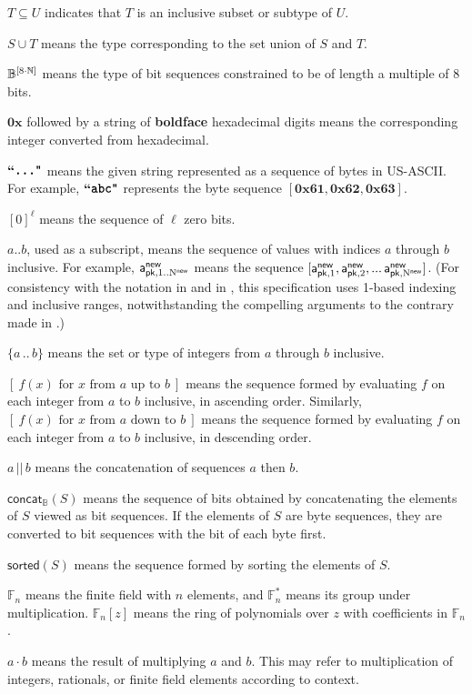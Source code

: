 \documentclass{article}
\renewcommand{\emph}[1]{\hspace{0.15em}{\fontfamily{pnc}\selectfont\scalebox{1.02}[0.999]{\textit{#1}}}\hspace{0.02em}}
\let\oldtexttt\texttt
\renewcommand{\texttt}[1]{\scalebox{1.02}[1.07]{\oldtexttt{#1}}}
\numberwithin{theorem}{subsection}
\newcommand{\zeros}[1]{[0]^{#1}}
\newcommand{\bit}{\mathbb{B}}
\newcommand{\Nat}{\mathbb{N}}
\newcommand{\typeexp}[2]{{#1}\vphantom{)}^{[{#2}]}}
\newcommand{\byteseqs}{\typeexp{\bit}{8 \mult \Nat}}
\newcommand{\concatbits}{\mathsf{concat}_\bit}
\newcommand{\listcomp}[1]{[~{#1}~]}
\newcommand{\for}{\text{ for }}
\newcommand{\from}{\text{ from }}
\newcommand{\upto}{\text{ up to }}
\newcommand{\downto}{\text{ down to }}
\newcommand{\sorted}{\mathsf{sorted}}
\newcommand{\hexint}[1]{\mathbf{0x{#1}}}
\newcommand{\ascii}[1]{\textbf{``\texttt{#1}"}}
\newcommand{\setof}[1]{\{{#1}\}}
\newcommand{\barerange}[2]{{#1}\,..\,{#2}}
\newcommand{\range}[2]{\setof{\barerange{#1}{#2}}}
\newcommand{\mult}{\cdot}
\newcommand{\union}{\cup}
\newcommand{\AuthPublicNew}[1]{\mathsf{a^{new}_{pk,\mathnormal{#1}}}}
\newcommand{\NNew}{\mathrm{N}^\mathsf{new}}
\newcommand{\allN}[1]{\mathrm{1}..\mathrm{N}^\mathsf{#1}}
\newcommand{\allNew}{\allN{new}}
\newcommand{\GF}[1]{\mathbb{F}_{\!#1}}
\newcommand{\GFstar}[1]{\mathbb{F}^\ast_{#1}}
\begin{document}
$T \subseteq U$ indicates that $T$ is an inclusive subset or subtype of $U$.

$S \union T$ means the type corresponding to the set union of $S$ and $T$.

$\byteseqs$ means the type of bit sequences constrained to be of length
a multiple of 8 bits.

$\hexint{}$ followed by a string of \textbf{boldface} hexadecimal
digits means the corresponding integer converted from hexadecimal.

$\ascii{...}$ means the given string represented as a
sequence of bytes in US-ASCII. For example, $\ascii{abc}$ represents the
byte sequence $[\hexint{61}, \hexint{62}, \hexint{63}]$.

$\zeros{\ell}$ means the sequence of $\ell$ zero bits.

$a..b$, used as a subscript, means the sequence of values
with indices $a$ through $b$ inclusive. For example,
$\AuthPublicNew{\allNew}$ means the sequence $[\AuthPublicNew{\mathrm{1}},
\AuthPublicNew{\mathrm{2}}, ...\,\AuthPublicNew{\NNew}]$.
(For consistency with the notation in \cite{BCG+2014} and in \cite{BK2016},
this specification uses 1-based indexing and inclusive ranges,
notwithstanding the compelling arguments to the contrary made in
\cite{EWD-831}.)

$\range{a}{b}$ means the set or type of integers from $a$ through
$b$ inclusive.

$\listcomp{f(x) \for x \from a \upto b}$ means the sequence
formed by evaluating $f$ on each integer from $a$ to $b$ inclusive, in
ascending order. Similarly, $\listcomp{f(x) \for x \from a \downto b}$ means
the sequence formed by evaluating $f$ on each integer from $a$ to $b$
inclusive, in descending order.

$a\,||\,b$ means the concatenation of sequences $a$ then $b$.

$\concatbits(S)$ means the sequence of bits obtained by
concatenating the elements of $S$ viewed as bit sequences. If the
elements of $S$ are byte sequences, they are converted to bit sequences
with the \emph{most significant} bit of each byte first.

$\sorted(S)$ means the sequence formed by sorting the elements
of $S$.

$\GF{n}$ means the finite field with $n$ elements, and
$\GFstar{n}$ means its group under multiplication.
$\GF{n}[z]$ means the ring of polynomials over $z$ with coefficients
in $\GF{n}$.

$a \mult b$ means the result of multiplying $a$ and $b$.
This may refer to multiplication of integers, rationals, or
finite field elements according to context.
\end{document}
